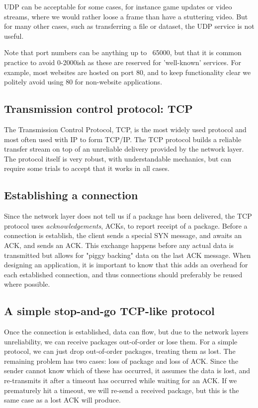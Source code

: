 UDP can be acceptable for some cases, for instance game updates or video streams, where we would rather loose a frame than have a stuttering video. But for many other cases, such as transferring a file or dataset, the UDP service is not useful.

Note that port numbers can be anything up to ~65000, but that it is common practice to avoid 0-2000ish as these are reserved for 'well-known' services. For example, most websites are hosted on port 80, and to keep functionality clear we politely avoid using 80 for non-website applications.

\subsection{Transmission control protocol: TCP}
The Transmission Control Protocol, TCP, is the most widely used protocol and most often used with IP to form TCP/IP. The TCP protocol builds a reliable transfer stream on top of an unreliable delivery provided by the network layer. The protocol itself is very robust, with understandable mechanics, but can require some trials to accept that it works in all cases.

\subsection{Establishing a connection}
Since the network layer does not tell us if a package has been delivered, the TCP protocol uses \emph{acknowledgements}, ACKs, to report receipt of a package. Before a connection is establish, the client sends a special SYN message, and awaits an ACK, and sends an ACK. This exchange happens before any actual data is transmitted but allows for "piggy backing" data on the last ACK message. When designing an application, it is important to know that this adds an overhead for each established connection, and thus connections should preferably be reused where possible. 

\subsection{A simple stop-and-go TCP-like protocol}
Once the connection is established, data can flow, but due to the network layers unreliability, we can receive packages out-of-order or lose them. For a simple protocol, we can just drop out-of-order packages, treating them as lost. The remaining problem has two cases: loss of package and loss of ACK. Since the sender cannot know which of these has occurred, it assumes the data is lost, and re-transmits it after a timeout has occurred while waiting for an ACK. If we prematurely hit a timeout, we will re-send a received package, but this is the same case as a lost ACK will produce.

